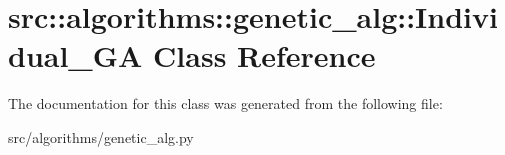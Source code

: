 \hypertarget{classsrc_1_1algorithms_1_1genetic__alg_1_1Individual__GA}{
\section{src::algorithms::genetic\_\-alg::Individual\_\-GA Class Reference}
\label{classsrc_1_1algorithms_1_1genetic__alg_1_1Individual__GA}
}


The documentation for this class was generated from the following file:\begin{DoxyCompactItemize}
\item 
src/algorithms/genetic\_\-alg.py\end{DoxyCompactItemize}
